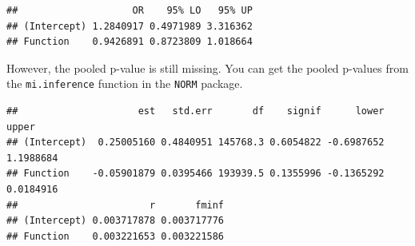 \documentclass[
]{book}
\newenvironment{Shaded}{\begin{snugshade}}{\end{snugshade}}
\newcommand{\ControlFlowTok}[1]{\textcolor[rgb]{0.13,0.29,0.53}{\textbf{#1}}}
\newcommand{\DataTypeTok}[1]{\textcolor[rgb]{0.13,0.29,0.53}{#1}}
\newcommand{\DecValTok}[1]{\textcolor[rgb]{0.00,0.00,0.81}{#1}}
\newcommand{\KeywordTok}[1]{\textcolor[rgb]{0.13,0.29,0.53}{\textbf{#1}}}
\newcommand{\NormalTok}[1]{#1}
\newcommand{\OperatorTok}[1]{\textcolor[rgb]{0.81,0.36,0.00}{\textbf{#1}}}
\newcommand{\StringTok}[1]{\textcolor[rgb]{0.31,0.60,0.02}{#1}}
\begin{document}
\begin{verbatim}
##                    OR    95% LO   95% UP
## (Intercept) 1.2840917 0.4971989 3.316362
## Function    0.9426891 0.8723809 1.018664
\end{verbatim}

However, the pooled p-value is still missing. You can get the pooled
p-values from the \texttt{mi.inference} function in the \texttt{NORM}
package.

\begin{Shaded}
\end{Shaded}

\begin{verbatim}
##                     est   std.err       df    signif      lower     upper
## (Intercept)  0.25005160 0.4840951 145768.3 0.6054822 -0.6987652 1.1988684
## Function    -0.05901879 0.0395466 193939.5 0.1355996 -0.1365292 0.0184916
##                       r       fminf
## (Intercept) 0.003717878 0.003717776
## Function    0.003221653 0.003221586
\end{verbatim}

\begin{Shaded}
\end{Shaded}
\end{document}
